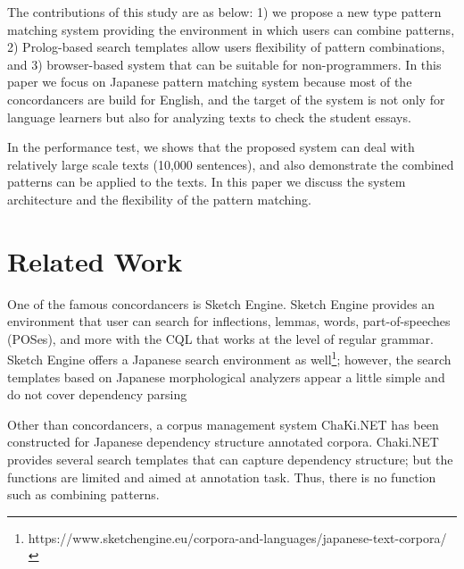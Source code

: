 \documentclass[conference]{IEEEtran}
\begin{document}
The contributions of this study are as below:
1) we propose a new type pattern matching system providing the environment in which users can
combine patterns,
2) Prolog-based search templates allow users flexibility of pattern combinations, and
3) browser-based system that can be suitable for non-programmers.
In this paper we focus on Japanese pattern matching system because
most of the concordancers are build for English, and the target of the system is
not only for language learners but also for analyzing texts to check the student essays.

In the performance test, we shows that the proposed system can deal with relatively large scale texts
(10,000 sentences), and also demonstrate the combined patterns can be applied to the texts.
In this paper we discuss the system architecture and the flexibility of the pattern matching.

\section{Related Work}

One of the famous concordancers is Sketch Engine. Sketch Engine provides an environment
that user can search for inflections, lemmas, words, part-of-speeches (POSes), and more
with the CQL that works at the level of regular grammar.
Sketch Engine offers a Japanese search environment as well\footnote{https://www.sketchengine.eu/corpora-and-languages/japanese-text-corpora/}; however, the search templates
based on Japanese morphological analyzers appear a little simple and
do not cover dependency parsing

Other than concordancers, a corpus management system ChaKi.NET
\cite{asahara2016} has been constructed for Japanese dependency
structure annotated corpora. Chaki.NET provides several search
templates that can capture dependency structure; but the functions are
limited and aimed at annotation task. Thus, there is no function such
as combining patterns.
\end{document}
